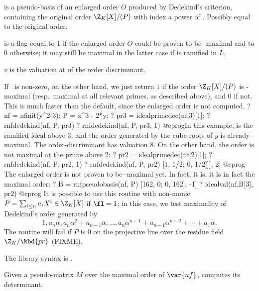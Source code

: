 \item {} is a pseudo-basis of an enlarged order $O$ produced by
Dedekind's criterion, containing the original order $\Z_K[X]/(P)$
with index a power of . Possibly equal to the original order.

\item {} is a flag equal to 1 if the enlarged order $O$
could be proven to be -maximal and to 0 otherwise; it may still be
maximal in the latter case if  is ramified in $L$,

\item $v$ is the valuation at  of the order discriminant.

If \fl\ is non-zero, on the other hand, we just return $1$ if the order
$\Z_K[X]/(P)$ is -maximal (resp.~maximal at all relevant primes, as
described above), and $0$ if not. This is much faster than the default,
since the enlarged order is not computed.
\bprog
? nf = nfinit(y^2-3); P = x^3 - 2*y;
? pr3 = idealprimedec(nf,3)[1];
? rnfdedekind(nf, P, pr3)
? rnfdedekind(nf, P, pr3, 1)
@eprog\noindent In this example,  is the ramified ideal above $3$,
and the order generated by the cube roots of $y$ is already
-maximal. The order-discriminant has valuation $8$. On the other
hand, the order is not maximal at the prime above 2:
\bprog
? pr2 = idealprimedec(nf,2)[1];
? rnfdedekind(nf, P, pr2, 1)
? rnfdedekind(nf, P, pr2)
     [1, 1/2; 0, 1/2]]], 2]
@eprog
The enlarged order is not proven to be -maximal yet. In fact, it
is; it is in fact the maximal order:
\bprog
? B = rnfpseudobasis(nf, P)
     [162, 0; 0, 162], -1]
? idealval(nf,B[3], pr2)
@eprog\noindent
It is possible to use this routine with non-monic
$P = \sum_{i\leq n} a_i X^i \in \Z_K[X]$ if $\fl = 1$;
in this case, we test maximality of Dedekind's order generated by
$$1, a_n \alpha, a_n\alpha^2 + a_{n-1}\alpha, \dots,
a_n\alpha^{n-1} + a_{n-1}\alpha^{n-2} + \cdots + a_1\alpha.$$
The routine will fail if $P$ is $0$ on the projective line over the residue
field $\Z_K/\kbd{pr}$ (FIXME).

The library syntax is .

\label{se:rnfdet}
Given a pseudo-matrix $M$ over the maximal
order of $\var{nf}$, computes its determinant.

